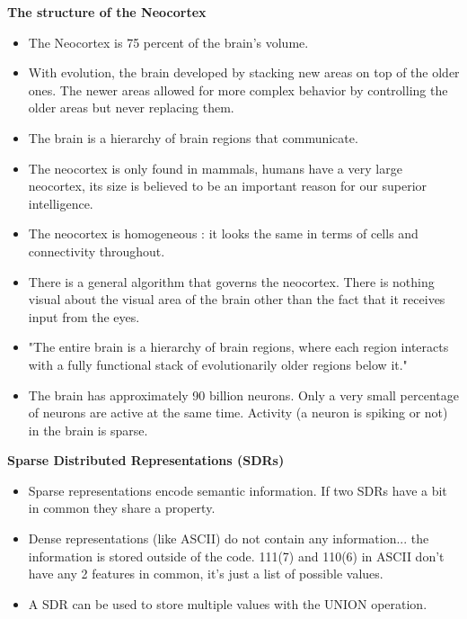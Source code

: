 \documentclass{article}
\begin{document}
\textbf{The structure of the Neocortex}
\begin{itemize}
\item The Neocortex is 75 percent of the brain's volume.
\item With evolution, the brain developed by stacking new areas on top of the older ones. The newer areas allowed for more complex behavior by controlling the older areas but never replacing them.  
\item The brain is a hierarchy of brain regions that communicate.
\item The neocortex is only found in mammals, humans have a very large neocortex, its size is believed to be an important reason for our superior intelligence.
\item The neocortex is homogeneous : it looks the same in terms of cells and connectivity throughout.
\item There is a general algorithm that governs the neocortex. There is nothing visual about the visual area of the brain other than the fact that it receives input from the eyes.
\item "The entire brain is a hierarchy of brain regions, where each region interacts with a fully functional stack of evolutionarily older regions below it."
\item The brain has approximately 90 billion neurons. Only a very small percentage of neurons are active at the same time. Activity (a neuron is spiking or not) in the brain is sparse.
\end{itemize}

\textbf{Sparse Distributed Representations (SDRs)}
\begin{itemize}
\item Sparse representations encode semantic information. If two SDRs have a bit in common they share a property.
\item Dense representations (like ASCII) do not contain any information... the information is stored outside of the code. 111(7) and 110(6) in ASCII don't have any 2 features in common, it's just a list of possible values.
\item A SDR can be used to store multiple values with the UNION operation.
\end{itemize}
\end{document}
